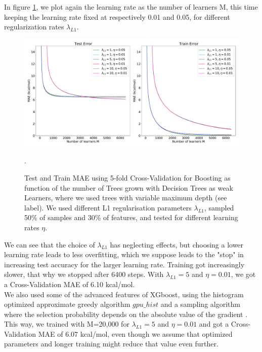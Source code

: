 \documentclass[11pt,a4paper,notitlepage]{article}
\begin{document}
In figure \ref{fig:boosting2}, we plot again the learning rate as the number of learners M, this time keeping the learning rate fixed at respectively 0.01 and 0.05, for different regularization rates $\lambda_{L1}$.
\begin{figure}[H]
\centering
\includegraphics[width=1\textwidth]{boosting2.pdf}
\caption[Boosting $M,\lambda_{L1}$]{Test and Train MAE using 5-fold Cross-Validation for Boosting as function of the number of Trees grown with Decision Trees as weak Learners, where we used trees with variable maximum depth (see label). We used different L1 regularisation parameters  $\lambda_{L1}$, sampled 50\% of samples and 30\% of features, and tested for different learning rates $\eta$.} \label{fig:boosting2}.
\end{figure}
We can see that the choice of $\lambda_{L1}$ has neglecting effects, but choosing a lower learning rate leads to less overfitting, which we suppose leads to the "stop" in increasing test accuracy for the larger learning rate. Training got increasingly slower, that why we stopped after 6400 steps. With $\lambda_{L1}=5$ and $\eta=0.01$, we got a Cross-Validation MAE of 6.10  kcal/mol. 
\\
We also used some of the advanced features of XGboost, using the histogram optimized approximate greedy algorithm $gpu\_hist$ and a sampling algorithm where the selection probability depends on the absolute value of the gradient \citep{XGboost}. This way, we trained with M=20,000 for $\lambda_{L1}=5$ and $\eta=0.01$ and got a Cross-Validation MAE of 6.07  kcal/mol, even though we assume that optimized parameters and longer training might reduce that value even further. \\
\end{document}
